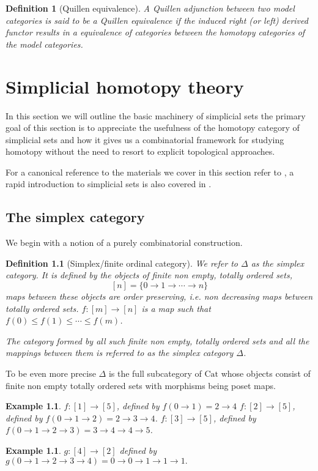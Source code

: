 \documentclass[12pt]{report}
\numberwithin{equation}{section}
\newtheorem{definition}[dummy]{Definition}
\newtheorem{example}[dummy]{Example}
\begin{document}
	\begin{definition}[Quillen equivalence]
		A Quillen adjunction between two model categories is said to be a Quillen equivalence if the induced right (or left) derived functor results in a equivalence of categories between the homotopy categories of the model categories.
	\end{definition}
	
	
	\chapter{Simplicial homotopy theory}
		
		In this section we will outline the basic machinery of simplicial sets the primary goal of this section is to appreciate the usefulness of the homotopy category of simplicial sets and how it gives us a combinatorial framework for studying homotopy without the need to resort to explicit topological approaches. 
		
		
		For a canonical reference to the materials we cover in this section refer to \cite{Goerss_Jardine_2009}, a rapid introduction to simplicial sets is also covered in \cite{Riehl2011ALI}.
	\section{The simplex category}
	We begin with a notion of a purely combinatorial construction.
	
	\begin{definition}[Simplex/finite ordinal category]
		We refer to $\Delta$ as the simplex category. It is defined by the objects of finite non empty, totally ordered sets,
		\[ [n]=\{0 \to 1 \to \cdots \to n\} \]
		maps between these objects are order preserving, i.e. non decreasing maps between totally ordered sets.
		$f: [m] \to [n]$ is a map such that $f(0) \leq f(1) \leq \cdots \leq f(m)$.
		
		The category formed by all such finite non empty, totally ordered sets and all the mappings between them is referred to as the simplex category $\Delta$.
	\end{definition}
	To be even more precise $\Delta$ is	the full subcategory of $\mathrm{Cat}$ whose objects consist of finite non empty totally ordered sets with morphisms being poset maps.
	
	
	\begin{example}
		\( f:[1]\to[5] \), defined by \( f(0 \to 1)= 2 \to 4 \)
		$f:[2] \to [5]$, defined by $f(0 \to 1 \to 2) = 2 \to 3 \to 4$.
		\( f:[3] \to [5] \), defined by \( f(0 \to 1 \to 2 \to 3)=3 \to 4 \to 4 \to 5 \).
	
	\end{example}	
	\begin{example}
		
		$g:[4] \to [2]$ defined by $g(0 \to 1 \to 2\to 3 \to 4) = 0\to 0 \to 1 \to 1 \to 1.$		
	\end{example}
	
\end{document}
